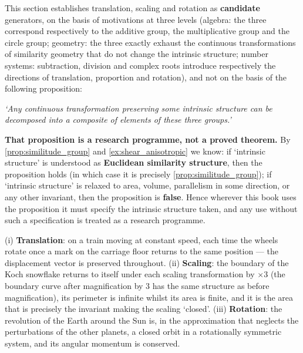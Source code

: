 \begin{remark}\label{rem:transform_scope}
This section establishes translation, scaling and rotation as \textbf{candidate} generators, on the basis of motivations at three levels (algebra: the three correspond respectively to the additive group, the multiplicative group and the circle group; geometry: the three exactly exhaust the continuous transformations of similarity geometry that do not change the intrinsic structure; number systems: subtraction, division and complex roots introduce respectively the directions of translation, proportion and rotation), and not on the basis of the following proposition:

\begin{center}
\textit{`Any continuous transformation preserving some intrinsic structure can be decomposed into a composite of elements of these three groups.'}
\end{center}

\textbf{That proposition is a research programme, not a proved theorem.} By \cref{prop:similitude_group} and \cref{ex:shear_anisotropic} we know: if `intrinsic structure' is understood as \textbf{Euclidean similarity structure}, then the proposition holds (in which case it is precisely \cref{prop:similitude_group}); if `intrinsic structure' is relaxed to area, volume, parallelism in some direction, or any other invariant, then the proposition is \textbf{false}. Hence wherever this book uses the proposition it must specify the intrinsic structure taken, and any use without such a specification is treated as a research programme.
\end{remark}

\begin{example}
(i) \textbf{Translation}: on a train moving at constant speed, each time the wheels rotate once a mark on the carriage floor returns to the same position --- the displacement vector is preserved throughout. (ii) \textbf{Scaling}: the boundary of the Koch snowflake returns to itself under each scaling transformation by $\times 3$ (the boundary curve after magnification by $3$ has the same structure as before magnification), its perimeter is infinite whilst its area is finite, and it is the area that is precisely the invariant making the scaling `closed'. (iii) \textbf{Rotation}: the revolution of the Earth around the Sun is, in the approximation that neglects the perturbations of the other planets, a closed orbit in a rotationally symmetric system, and its angular momentum is conserved.
\end{example}

